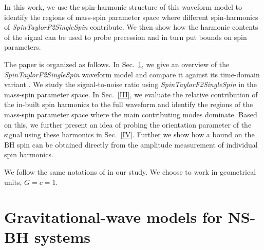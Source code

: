 \documentclass[preprint,onecolumn,,tightenlines,superscriptaddress,showpacs,nofootinbib,eqsecnum,amsfonts,amsmath]{revtex4}
\def\ARCH#1{\textcolor{black}{ARCH:#1}}
\begin{document}
In this work, we use the spin-harmonic structure of this waveform model to
identify the regions of mass-spin parameter space where different spin-harmonics of
{\it SpinTaylorF2SingleSpin} contribute. We then show how the harmonic contents
of the signal can be used to probe precession and in turn put bounds on spin
parameters.

The paper is organized as follows. In Sec.~\ref{II}, we give an overview of the
{\it SpinTaylorF2SingleSpin} waveform model and compare it against its
time-domain variant \cite{Pan:2003qt,Buonanno:2009zt,Harry:2013tca}. We study
the signal-to-noise ratio using {\it SpinTaylorF2SingleSpin} in the mass-spin
parameter space. In Sec.~\ref{III}, we evaluate the relative contribution of the
in-built spin harmonics to the full waveform and identify the regions of the mass-spin 
parameter space where the main contributing modes dominate. Based on this, we further 
present an idea of probing the orientation parameter of the signal using these harmonics in Sec.~\ref{IV}.
Further we show how a bound on the BH spin can be obtained directly from the amplitude measurement 
of individual spin harmonics.

We follow the same notations of \cite{AS2014} in our study. We choose to work in
geometrical units, $G=c=1$.

\section{Gravitational-wave models for NS-BH systems}
\label{II}
\end{document}
